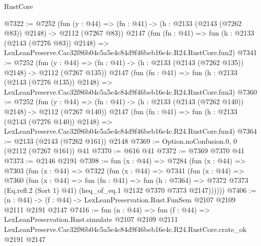 \begin{lexlean}{RustCore}
\begin{coremodule}
@7322 := @7252
    (fun (y : @44) => (fn : @41) -> (h : @2133 (@2143 (@7262 @83)) @2148) -> @2112 (@7267 @83))
    @2147
    (fun (fn : @41) =>
    fun (h : @2133 (@2143 (@7276 @83)) @2148) =>
    LexLeanPreserve.Cac32f86b04c5a5e4c84d9f46beb16e4c.R24.RustCore.fun2)
@7341 := @7252
    (fun (y : @44) => (fn : @41) -> (h : @2133 (@2143 (@7262 @135)) @2148) -> @2112 (@7267 @135))
    @2147
    (fun (fn : @41) =>
    fun (h : @2133 (@2143 (@7276 @135)) @2148) =>
    LexLeanPreserve.Cac32f86b04c5a5e4c84d9f46beb16e4c.R24.RustCore.fun3)
@7360 := @7252
    (fun (y : @44) => (fn : @41) -> (h : @2133 (@2143 (@7262 @140)) @2148) -> @2112 (@7267 @140))
    @2147
    (fun (fn : @41) =>
    fun (h : @2133 (@2143 (@7276 @140)) @2148) =>
    LexLeanPreserve.Cac32f86b04c5a5e4c84d9f46beb16e4c.R24.RustCore.fun4)
@7364 := @2133 (@2143 (@7262 @161)) @2148
@7369 := Option.noConfusion.{0, 0} (@2112 (@7267 @161)) @41
@7370 := @616 @41
@7372 := @7369 @7370 @41
@7373 := @2146 @2191
@7398 := fun (x : @44) =>
  @7284
    (fun (x : @44) =>
    @7303
      (fun (x : @44) =>
      @7322
        (fun (x : @44) =>
        @7341
          (fun (x : @44) =>
          @7360
            (fun (x : @44) =>
            fun (fn : @41) =>
            fun (h : @7364) =>
            @7372 @7373 (Eq.refl.{2} (Sort 1) @41) (heq_of_eq.{1} @2132 @7370 @7373 @2147))))))
@7406 := (n : @44) -> (f : @44) -> LexLeanPreservation.Rust.FunSem @2107 @2109 @2111 @2191 @2147
@7416 := fun (n : @44) =>
  fun (f : @44) =>
  LexLeanPreservation.Rust.simulate
    @2107
    @2109
    @2111
    LexLeanPreserve.Cac32f86b04c5a5e4c84d9f46beb16e4c.R24.RustCore.crate_ok
    @2191
    @2147
\end{coremodule}
\end{lexlean}
